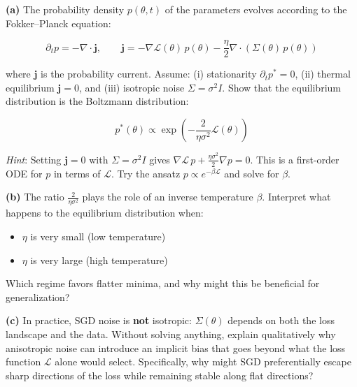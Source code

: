 \documentclass[
]{article}
\providecommand{\tightlist}{%
  \setlength{\itemsep}{0pt}\setlength{\parskip}{0pt}}
\begin{document}
\textbf{(a)} The probability density \(p(\theta, t)\) of the parameters
evolves according to the Fokker--Planck equation:

\[\partial_t p = -\nabla \cdot \mathbf{j}, \qquad \mathbf{j} = -\nabla \mathcal{L}(\theta)\,p(\theta) - \frac{\eta}{2}\nabla \cdot \left(\Sigma(\theta)\,p(\theta)\right)\]

where \(\mathbf{j}\) is the probability current. Assume: (i)
stationarity \(\partial_t p^* = 0\), (ii) thermal equilibrium
\(\mathbf{j} = 0\), and (iii) isotropic noise \(\Sigma = \sigma^2 I\).
Show that the equilibrium distribution is the Boltzmann distribution:

\[p^*(\theta) \propto \exp\left(-\frac{2}{\eta \sigma^2}\mathcal{L}(\theta)\right)\]

\emph{Hint}: Setting \(\mathbf{j} = 0\) with \(\Sigma = \sigma^2 I\)
gives \(\nabla \mathcal{L}\, p + \frac{\eta\sigma^2}{2}\nabla p = 0\).
This is a first-order ODE for \(p\) in terms of \(\mathcal{L}\). Try the
ansatz \(p \propto e^{-\beta \mathcal{L}}\) and solve for \(\beta\).

\textbf{(b)} The ratio \(\frac{2}{\eta \sigma^2}\) plays the role of an
inverse temperature \(\beta\). Interpret what happens to the equilibrium
distribution when:

\begin{itemize}
\tightlist
\item
  \(\eta\) is very small (low temperature)
\item
  \(\eta\) is very large (high temperature)
\end{itemize}

Which regime favors flatter minima, and why might this be beneficial for
generalization?

\textbf{(c)} In practice, SGD noise is \textbf{not} isotropic:
\(\Sigma(\theta)\) depends on both the loss landscape and the data.
Without solving anything, explain qualitatively why anisotropic noise
can introduce an implicit bias that goes beyond what the loss function
\(\mathcal{L}\) alone would select. Specifically, why might SGD
preferentially escape sharp directions of the loss while remaining
stable along flat directions?
\end{document}
